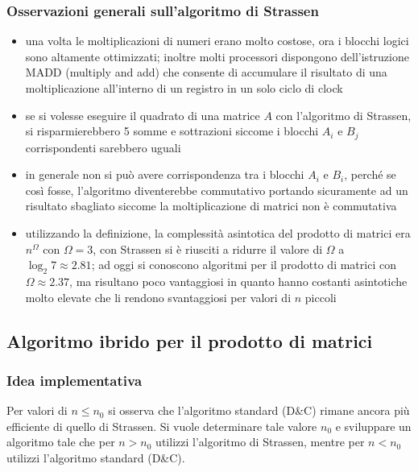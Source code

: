 \subsubsection*{Osservazioni generali sull'algoritmo di Strassen}
\begin{itemize}
	\item una volta le moltiplicazioni di numeri erano molto costose, ora i blocchi logici sono altamente ottimizzati; inoltre
	molti processori dispongono dell'istruzione MADD (multiply and add) che consente di accumulare il risultato di una
	moltiplicazione all'interno di un registro in un solo ciclo di clock
	\item se si volesse eseguire il quadrato di una matrice \(A\) con l'algoritmo di Strassen, si risparmierebbero 5 somme
	e sottrazioni siccome i blocchi \(A_i\) e \(B_j\) corrispondenti sarebbero uguali
	\item in generale non si può avere corrispondenza tra i blocchi \(A_i\) e \(B_i\), perché se così fosse, l'algoritmo
	diventerebbe commutativo portando sicuramente ad un risultato sbagliato siccome la moltiplicazione di matrici non è
	commutativa
	\item utilizzando la definizione, la complessità asintotica del prodotto di matrici era \(n^\Omega\) con \(\Omega = 3\),
	con Strassen si è riusciti a ridurre il valore di \(\Omega\) a \(\log_2 7 \approx 2.81\); ad oggi si conoscono algoritmi
	per il prodotto di matrici con \(\Omega \approx 2.37\), ma risultano poco vantaggiosi in quanto hanno costanti asintotiche
	molto elevate che li rendono svantaggiosi per valori di \(n\) piccoli
\end{itemize}

\subsection{Algoritmo ibrido per il prodotto di matrici}
\subsubsection*{Idea implementativa}
Per valori di \(n \leq n_0\) si osserva che l'algoritmo standard (D\&C) rimane ancora più efficiente di quello di Strassen.
Si vuole determinare tale valore \(n_0\) e sviluppare un algoritmo tale che per \(n > n_0\) utilizzi l'algoritmo di Strassen,
mentre per \(n < n_0\) utilizzi l'algoritmo standard (D\&C).

